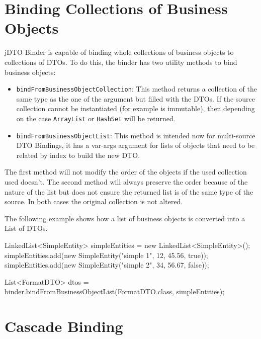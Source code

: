 \documentclass[11pt]{article}
\newcommand{\JDTO}{jDTO Binder\xspace}
\begin{document}
\clearpage


\section{Binding Collections of Business Objects}


\JDTO is capable of binding whole collections of business objects to collections of DTOs. To do this, the binder has two utility methods to bind business objects:

\begin{itemize}
\item \texttt{bindFromBusinessObjectCollection}: This method returns a collection of the same type as the one of the argument but filled with the DTOs. If the source collection cannot be instantiated (for example is immutable), then depending on the case \texttt{ArrayList} or \texttt{HashSet} will be returned.

\item \texttt{bindFromBusinessObjectList}: This method is intended now for multi-source DTO Bindings, it has a var-args argument for lists of objects that need to be related by index to build the new DTO.

\end{itemize}

The first method will not modify the order of the objects if the used collection used doesn't. The second method will always preserve the order because of the nature of the list but does not ensure the returned list is of the same type of the source. In both cases the original collection is not altered.

The following example shows how a list of business objects is converted into a List of DTOs.

\begin{java}
LinkedList<SimpleEntity> simpleEntities = 
    new LinkedList<SimpleEntity>();
simpleEntities.add(new SimpleEntity("simple 1", 12, 45.56, true));
simpleEntities.add(new SimpleEntity("simple 2", 34, 56.67, false));

List<FormatDTO> dtos = binder.bindFromBusinessObjectList(FormatDTO.class, simpleEntities);
\end{java}

\clearpage

\section{Cascade Binding}
\end{document}
